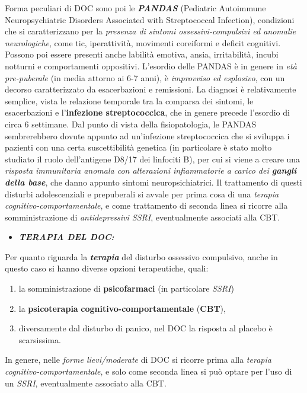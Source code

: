 \documentclass[]{article}
\begin{document}
Forma peculiari di DOC sono poi le \textbf{\emph{PANDAS}} (Pediatric
Autoimmune Neuropsychiatric Disorders Associated with Streptococcal
Infection), condizioni che si caratterizzano per la \emph{presenza di
sintomi ossessivi-compulsivi ed anomalie neurologiche}, come tic,
iperattività, movimenti coreiformi e deficit cognitivi. Possono poi
essere presenti anche labilità emotiva, ansia, irritabilità, incubi
notturni e comportamenti oppositivi. L'esordio delle PANDAS è in genere
in \emph{età pre-puberale} (in media attorno ai 6-7 anni), è
\emph{improvviso ed esplosivo}, con un decorso caratterizzato da
esacerbazioni e remissioni. La diagnosi è relativamente semplice, vista
le relazione temporale tra la comparsa dei sintomi, le esacerbazioni e
l'\textbf{infezione streptococcica}, che in genere precede l'esordio di
circa 6 settimane. Dal punto di vista della fisiopatologia, le PANDAS
sembrerebbero dovute appunto ad un'infezione streptococcica che si
sviluppa i pazienti con una certa suscettibilità genetica (in
particolare è stato molto studiato il ruolo dell'antigene D8/17 dei
linfociti B), per cui si viene a creare una \emph{risposta immunitaria
anomala con alterazioni infiammatorie a carico dei \textbf{gangli della
base}}, che danno appunto sintomi neuropsichiatrici. Il trattamento di
questi disturbi adolescenziali e prepuberali si avvale per prima cosa di
una \emph{terapia cognitivo-comportamentale}, e come trattamento di
seconda linea si ricorre alla somministrazione di \emph{antidepressivi
SSRI}, eventualmente associati alla CBT.

\begin{itemize}
\item
  \textbf{\emph{TERAPIA DEL DOC:}}
\end{itemize}

Per quanto riguarda la \textbf{\emph{terapia}} del disturbo ossessivo
compulsivo, anche in questo caso si hanno diverse opzioni terapeutiche,
quali:

\begin{enumerate}
\def\labelenumi{\arabic{enumi}.}
\item
  la somministrazione di \textbf{psicofarmaci} (in particolare
  \emph{SSRI})
\item
  la \textbf{psicoterapia} \textbf{cognitivo-comportamentale}
  (\textbf{CBT}),
\item
  diversamente dal disturbo di panico, nel DOC la risposta al placebo è
  scarsissima.
\end{enumerate}

In genere, nelle \emph{forme lievi/moderate} di DOC si ricorre prima
alla \emph{terapia cognitivo-comportamentale}, e solo come seconda linea
si può optare per l'uso di un \emph{SSRI}, eventualmente associato alla
CBT.
\end{document}
